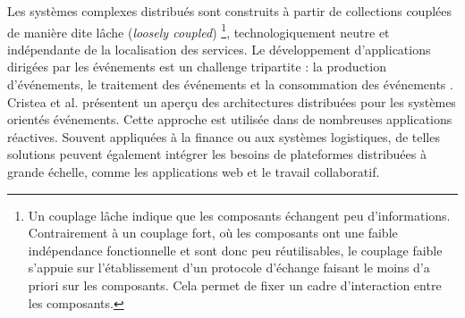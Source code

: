 Les systèmes complexes distribués sont construits à partir de collections 
couplées de manière dite \og lâche\fg{} (\textit{loosely coupled}) \footnote{Un 
	couplage lâche indique que les 
	composants échangent peu d'informations. Contrairement à un couplage fort, où 
	les 
	composants ont une faible indépendance fonctionnelle et sont donc peu 
	réutilisables, le couplage faible s'appuie sur l'établissement d'un protocole 
	d'échange faisant le moins d'a priori sur les composants. Cela permet de fixer 
	un 
	cadre d'interaction entre les composants.}, technologiquement neutre 
et indépendante de la localisation des services. 
Le développement d'applications dirigées par les événements est un challenge 
tripartite : la production d'événements, le traitement des événements et la 
consommation des événements \cite{Chandy2011}.
Cristea et al. \cite{Cristea2011} présentent un aperçu des architectures distribuées 
pour les systèmes orientés événements. 
Cette approche est utilisée dans de nombreuses applications réactives. Souvent 
appliquées à la finance ou aux systèmes logistiques, de telles solutions peuvent 
également intégrer les besoins de plateformes distribuées à grande échelle, 
comme les applications web et le travail collaboratif. 



